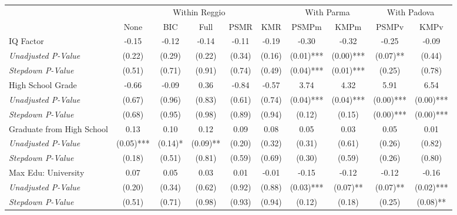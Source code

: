 \begin{tabular}{l c c c c c c c c c}
\toprule
& \multicolumn{5}{c}{Within Reggio} & \multicolumn{2}{c}{With Parma} & \multicolumn{2}{c}{With Padova} \\\cmidrule(lr){2-6} \cmidrule(lr){7-8} \cmidrule(lr){9-10}
 & None & BIC & Full & PSMR & KMR & PSMPm & KMPm & PSMPv & KMPv \\
\midrule
IQ Factor & -0.15 & -0.12 & -0.14 & -0.11 & -0.19 & -0.30 & -0.32 & -0.25 & -0.09 \\
\quad \textit{Unadjusted P-Value} & (0.22) & (0.29) & (0.22) & (0.34) & (0.16) & (0.01)*** & (0.00)*** & (0.07)** & (0.44) \\
\quad \textit{Stepdown P-Value} & (0.51) & (0.71) & (0.91) & (0.74) & (0.49) & (0.04)*** & (0.01)*** & (0.25) & (0.78) \\
High School Grade & -0.66 & -0.09 & 0.36 & -0.84 & -0.57 & 3.74 & 4.32 & 5.91 & 6.54 \\
\quad \textit{Unadjusted P-Value} & (0.67) & (0.96) & (0.83) & (0.61) & (0.74) & (0.04)*** & (0.04)*** & (0.00)*** & (0.00)*** \\
\quad \textit{Stepdown P-Value} & (0.68) & (0.95) & (0.98) & (0.89) & (0.94) & (0.12) & (0.15) & (0.00)*** & (0.00)*** \\
Graduate from High School & 0.13 & 0.10 & 0.12 & 0.09 & 0.08 & 0.05 & 0.03 & 0.05 & 0.01 \\
\quad \textit{Unadjusted P-Value} & (0.05)*** & (0.14)* & (0.09)** & (0.20) & (0.32) & (0.31) & (0.61) & (0.26) & (0.82) \\
\quad \textit{Stepdown P-Value} & (0.18) & (0.51) & (0.81) & (0.59) & (0.69) & (0.30) & (0.59) & (0.26) & (0.80) \\
Max Edu: University & 0.07 & 0.05 & 0.03 & 0.01 & -0.01 & -0.15 & -0.12 & -0.12 & -0.16 \\
\quad \textit{Unadjusted P-Value} & (0.20) & (0.34) & (0.62) & (0.92) & (0.88) & (0.03)*** & (0.07)** & (0.07)** & (0.02)*** \\
\quad \textit{Stepdown P-Value} & (0.51) & (0.71) & (0.98) & (0.93) & (0.94) & (0.12) & (0.18) & (0.25) & (0.08)** \\
\bottomrule
\end{tabular}
